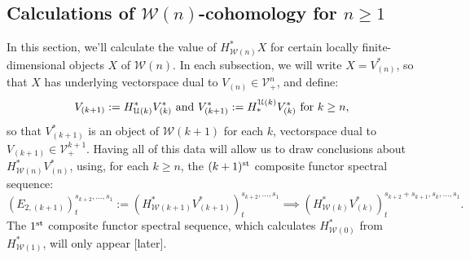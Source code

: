 \documentclass[11pt]{amsart}
\theoremstyle{plain}
\theoremstyle{definition}
\newcommand{\calW}{\mathcal{W}}
\newcommand{\calU}{\mathcal{U}}
\newcommand{\calV}{\mathcal{V}}
\theoremstyle{plain}
\newcommand{\vect}[2]{\calV^{#1}_{#2}}
\begin{document}
\begin{Calculations of HWn for n nonzero}
\section{\textbf{Calculations of ${\calW(n)}$-cohomology for $n\geq 1$}}
In this section, we'll calculate the value of $H^*_{\calW(n)}X$ for certain locally finite-dimensional objects $X$ of $\calW(n)$. In each subsection, we will write $X=V^*_{(n)}$, so that $X$ has underlying vectorspace dual to $V_{{(n)}}\in\vect{n}{+}$, and define:
\[V_{(k+1)}:=H^*_{\calU(k)}V^*_{(k)}\textup{ and }V^*_{(k+1)}:=H_*^{\calU(k)}V^*_{(k)}\textup{ for $k\geq n$},\]
so that $V^*_{(k+1)}$ is an object of $\calW(k+1)$ for each $k$, vectorspace dual to $V_{(k+1)}\in\vect{k+1}{+}$.
Having all of this data will allow us to draw conclusions about $H^*_{\calW(n)}V^*_{(n)}$, using, for each $k\geq n$, the $(k+1)^{\textup{st}}$ composite functor spectral sequence:
\[(E_{2,(k+1)})^{s_{k+2},\ldots,s_1}_{t}:=(H^*_{\calW(k+1)}V^*_{(k+1)})^{s_{k+2},\ldots,s_1}_{t}\implies (H^*_{\calW(k)}V^*_{(k)})^{s_{k+2}+s_{k+1},s_k,\ldots,s_1}_{t}.\]
The $1^{\textup{st}}$ composite functor spectral sequence, which calculates $H^*_{\calW(0)}$ from $H^*_{\calW(1)}$, will only appear [later].




\end{Calculations of HWn for n nonzero}
\end{document}
